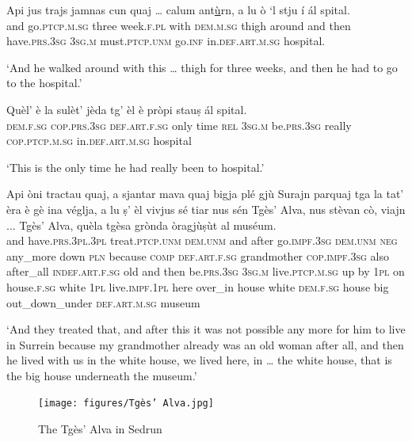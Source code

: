 \begin{linenumbers}
\gll  Api jus trajs jamnas cun quaj … calum ant\underline{ù}rn, a lu ò `l stju í ál spital.  \\
and go.\textsc{ptcp.m.sg} three week.\textsc{f.pl} with \textsc{dem.m.sg} {} thigh around and then have.\textsc{prs.3sg} \textsc{3sg.m} must.\textsc{ptcp.unm} go.\textsc{inf} in.\textsc{def.art.m.sg} hospital. \\
\end{linenumbers}
\medskip
\glt `And he walked around with this … thigh for three weeks, and then he had to go to the hospital.'
\medskip

\begin{linenumbers}
\gll  Quèl’ è la sulèt’ jèda tg’ èl è pròpi stauṣ ál spital.  \\
 \textsc{dem.f.sg} \textsc{cop.prs.3sg} \textsc{def.art.f.sg} only time \textsc{rel} \textsc{3sg.m} be.\textsc{prs.3sg} really \textsc{cop.ptcp.m.sg} in.\textsc{def.art.m.sg} hospital  \\
\end{linenumbers}
\medskip
\glt `This is the only time he had really been to hospital.'
\medskip

\begin{linenumbers}
\gll Api òni tractau quaj, a sjantar mava quaj bigja plé gjù Surajn parquaj tga la tat’ èra è gè ina véglja, a lu ṣ’ èl vivjus sé tiar nus sén Tgès’ Alva, nus stèvan cò, viajn ... Tgès’ Alva, quèla tgèsa grònda òragjùṣùt al muséum.\\
and have.\textsc{prs.3pl.3pl} treat.\textsc{ptcp.unm} \textsc{dem.unm} and after go.\textsc{impf.3sg} \textsc{dem.unm} \textsc{neg} any\_more down \textsc{pln} because \textsc{comp} \textsc{def.art.f.sg} grandmother \textsc{cop.impf.3sg} also after\_all \textsc{indef.art.f.sg} old and then be.\textsc{prs.3sg} \textsc{3sg.m} live.\textsc{ptcp.m.sg} up by \textsc{1pl} on house.\textsc{f.sg} white \textsc{1pl} live.\textsc{impf.1pl} here over\_in {} house white \textsc{dem.f.sg} house big out\_down\_under \textsc{def.art.m.sg} museum\\
\end{linenumbers}
\medskip
\glt `And they treated that, and after this it was not possible any more for him to live in Surrein because my grandmother already was an old woman after all, and then he lived with us in the white house, we lived here,  in … the white house, that is the big house underneath the museum.'
\medskip

\begin{figure}
	\texttt{[image: figures/Tgès' Alva.jpg]}
	\caption{The Tgès' Alva in Sedrun}
\end{figure}


